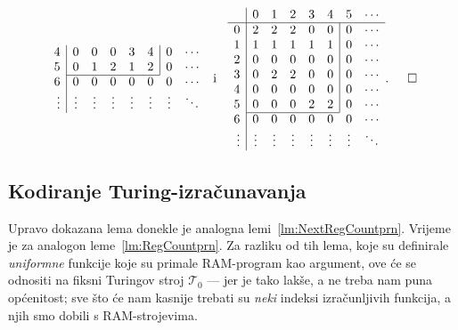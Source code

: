 \begin{primjer}[{name=[kodirana tablica prijelaza]}]
\begin{equation}
\begin{array}{r|ccccccc}
4& 0 & 0 & 0 & 3 & 4 & \multicolumn{1}{|c}{0} & \cdots\\
5& 0 & 1 & 2 & 1 & 2 & \multicolumn{1}{|c}{0} & \cdots\\ \cline{2-6}
6& 0 & 0 & 0 & 0 & 0 & 0 & \cdots\\
\vdots&\vdots&\vdots&\vdots&\vdots&\vdots&\vdots&\ddots
\end{array}\;\text{ i }\;\;
\begin{array}{r|ccccccc}
    &0&1&2&3&4&5&\cdots\\\hline
0& 2 & 2 & 2 & 0 & 0 & \multicolumn{1}{|c}{0} & \cdots\\
1& 1 & 1 & 1 & 1 & 1 & \multicolumn{1}{|c}{0} & \cdots\\
2& 0 & 0 & 0 & 0 & 0 & \multicolumn{1}{|c}{0} & \cdots\\
3& 0 & 2 & 2 & 0 & 0 & \multicolumn{1}{|c}{0} & \cdots\\
4& 0 & 0 & 0 & 0 & 0 & \multicolumn{1}{|c}{0} & \cdots\\
5& 0 & 0 & 0 & 2 & 2 & \multicolumn{1}{|c}{0} & \cdots\\ \cline{2-6}
6& 0 & 0 & 0 & 0 & 0 & 0 & \cdots\\
\vdots&\vdots&\vdots&\vdots&\vdots&\vdots&\vdots&\ddots
\end{array}\text.\!\!\!\qedhere
\end{equation}
\end{primjer}

\subsection{Kodiranje Turing-izračunavanja}

Upravo dokazana lema donekle je analogna lemi~\ref{lm:NextRegCountprn}. Vrijeme je za analogon leme~\ref{lm:RegCountprn}. Za razliku od tih lema, koje su definirale \emph{uniformne} funkcije koje su primale RAM-program kao argument, ove će se odnositi na fiksni Turingov stroj $\mathcal T_0$ --- jer je tako lakše, a ne treba nam puna općenitost; sve što će nam kasnije trebati su \emph{neki} indeksi izračunljivih funkcija, a njih smo dobili s RAM-strojevima.

